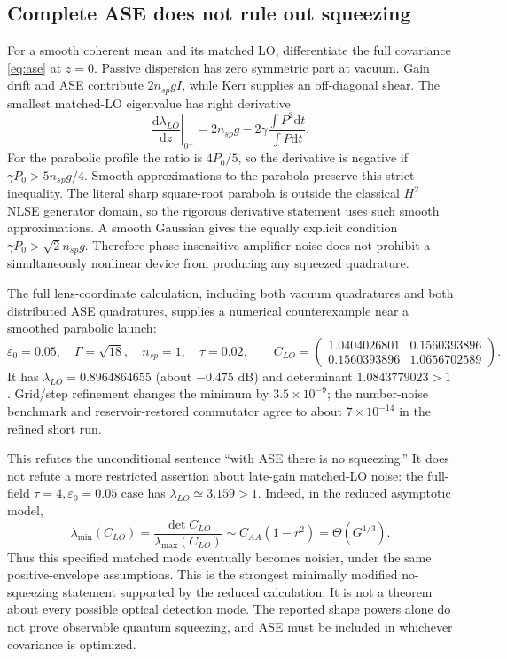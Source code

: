 \documentclass[11pt,a4paper]{article}
\newcommand{\dd}{\mathrm d}
\newcommand{\eps}{\varepsilon}
\begin{document}
\subsection{Complete ASE does not rule out squeezing}

For a smooth coherent mean and its matched LO, differentiate the full covariance \eqref{eq:ase} at $z=0$. Passive dispersion has zero symmetric part at vacuum. Gain drift and ASE contribute $2n_{sp}gI$, while Kerr supplies an off-diagonal shear. The smallest matched-LO eigenvalue has right derivative
\begin{equation}\label{eq:counter}
\left.\frac{\dd\lambda_{LO}}{\dd z}\right|_{0^+}
=2n_{sp}g-2\gamma\frac{\int P^2\dd t}{\int P\dd t}.
\end{equation}
For the parabolic profile the ratio is $4P_0/5$, so the derivative is negative if $\gamma P_0>5n_{sp}g/4$. Smooth approximations to the parabola preserve this strict inequality. The literal sharp square-root parabola is outside the classical $H^2$ NLSE generator domain, so the rigorous derivative statement uses such smooth approximations. A smooth Gaussian gives the equally explicit condition $\gamma P_0>\sqrt2 n_{sp}g$. Therefore phase-insensitive amplifier noise does not prohibit a simultaneously nonlinear device from producing any squeezed quadrature.

The full lens-coordinate calculation, including both vacuum quadratures and both distributed ASE quadratures, supplies a numerical counterexample near a smoothed parabolic launch:
\begin{equation}
\eps_0=0.05,\quad \Gamma=\sqrt{18},\quad n_{sp}=1,\quad \tau=0.02,
\qquad
C_{LO}=\begin{pmatrix}
1.0404026801&0.1560393896\\
0.1560393896&1.0656702589
\end{pmatrix}.
\end{equation}
It has $\lambda_{LO}=0.8964864655$ (about $-0.475$ dB) and determinant $1.0843779023>1$. Grid/step refinement changes the minimum by $3.5\times10^{-9}$; the number-noise benchmark and reservoir-restored commutator agree to about $7\times10^{-14}$ in the refined short run.

This refutes the unconditional sentence ``with ASE there is no squeezing.'' It does not refute a more restricted assertion about late-gain matched-LO noise: the full-field $\tau=4,\eps_0=0.05$ case has $\lambda_{LO}\simeq3.159>1$. Indeed, in the reduced asymptotic model,
\begin{equation}
\lambda_{\min}(C_{LO})=\frac{\det C_{LO}}{\lambda_{\max}(C_{LO})}
\sim C_{AA}(1-r^2)=\Theta(G^{1/3}).
\end{equation}
Thus this specified matched mode eventually becomes noisier, under the same positive-envelope assumptions. This is the strongest minimally modified no-squeezing statement supported by the reduced calculation. It is not a theorem about every possible optical detection mode. The reported shape powers alone do not prove observable quantum squeezing, and ASE must be included in whichever covariance is optimized.
\end{document}
